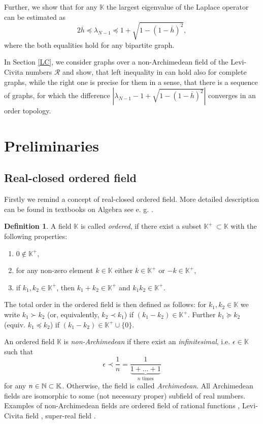 \documentclass[a4paper,12pt]{amsart}
\theoremstyle{definition}
\newtheorem{definition}{Definition}
\newcommand{\K}{\mathbb{K}}
\newcommand{\R}{\mathcal{R}}
\begin{document}
Further, we show that for any $\mathbb K$ the largest eigenvalue of the Laplace operator can be estimated as 
\begin{equation}\label{eqLambdah}
2 \overline h\preceq \lambda_{N-1} \preceq 1+\sqrt{1-(1-\overline h)^2},
\end{equation}
where the both equalities hold for any bipartite graph.

In Section \ref{LC}, we consider graphs over a non-Archimedean field of the Levi-Civita numbers $\R$ and show, that left inequality in \label{eqLambdah} can hold also for complete graphs, while the right one is precise for them in a sense, that there is a sequence of graphs, for which the difference $|\lambda_{N-1} - 1+\sqrt{1-(1-\overline h)^2}|$ converges in an order topology. 

\section{Preliminaries}

\subsection{Real-closed ordered field}
Firstly we remind a concept of real-closed ordered field. More detailed description can be found in textbooks on Algebra see e. g. \cite{Lang, Waerden}.

\begin{definition}
A field $\K$ is called {\em ordered}, if there exist a subset $\K^+~\subset \K$ with the following properties:
\begin{enumerate}
\item 
$0\not \in \K^+$,
\item
for any non-zero element $k\in \K$ either $k\in \K^+$ or $-k\in \K^+$,
\item
if $k_1, k_2\in \K^+$, then $k_1+k_2\in \K^+$ and $k_1k_2\in \K^+$.

\end{enumerate}
\end{definition}
The total order in the  ordered field is then defined as follows: for $k_1,k_2 \in \K$ we write $k_1\succ k_2$ (or, equivalently, $k_2\prec k_1$) if $(k_1-k_2)\in \K^+$. Further $k_1\succeq k_2$ (equiv. $k_1\preceq k_2$) if $(k_1-k_2)\in \K^+\cup\{0\}$. 

An ordered field $\K$ is {\em non-Archimedean} if there exist an {\em infinitesimal}, i.e. $\epsilon \in \K$ such that 
$$
{\epsilon}\prec \dfrac{1}{n}=\dfrac{1}{\underbrace{1+\dots+1}_{n\mbox{ times}}}
$$
for any $n\in \Bbb N\subset\K$. Otherwise, the field is called {\em Archimedean}. All Archimedean fields are isomorphic to some (not necessary proper) subfield of real numbers. Examples of non-Archimedean fields are ordered field of rational functions \cite[p. A.VI.21]{Bourbaki}, Levi-Civita field \cite{Berz, Hall}, super-real field \cite{DalesHughWoodin}.
\end{document}
